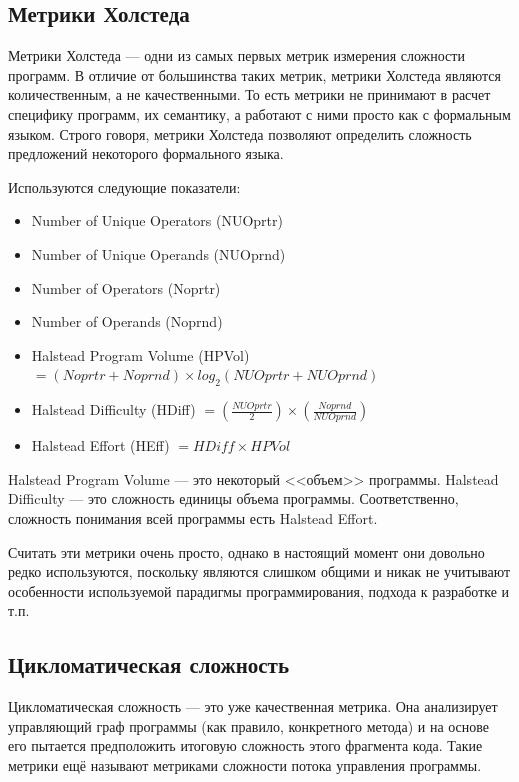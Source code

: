 \documentclass{../../text-style}
\begin{document}
\subsection{Метрики Холстеда}

Метрики Холстеда --- одни из самых первых метрик измерения сложности программ. В отличие от большинства таких метрик, метрики Холстеда являются количественным, а не качественными. То есть метрики не принимают в расчет специфику программ, их семантику, а работают с ними просто как с формальным языком. Строго говоря, метрики Холстеда позволяют определить сложность предложений некоторого формального языка. 

Используются следующие показатели:

\begin{itemize}
    \item Number of Unique Operators (NUOprtr)
    \item Number of Unique Operands (NUOprnd)
    \item Number of Operators (Noprtr)
    \item Number of Operands (Noprnd)
    \item Halstead Program Volume (HPVol) $= (Noprtr + Noprnd) \times log_2(NUOprtr + NUOprnd)$
    \item Halstead Difficulty (HDiff) $= (\frac{NUOprtr}{2}) \times (\frac{Noprnd}{NUOprnd})$
    \item Halstead Effort (HEff) $= HDiff \times HPVol$
\end{itemize}

Halstead Program Volume --- это некоторый <<объем>> программы. Halstead Difficulty --- это сложность единицы объема программы. Соответственно, сложность понимания всей программы есть Halstead Effort.

Считать эти метрики очень просто, однако в настоящий момент они довольно редко используются, поскольку являются слишком общими и никак не учитывают особенности используемой парадигмы программирования, подхода к разработке и т.п.

\subsection{Цикломатическая сложность}

Цикломатическая сложность --- это уже качественная метрика. Она анализирует управляющий граф программы (как правило, конкретного метода) и на основе его пытается предположить итоговую сложность этого фрагмента кода. Такие метрики ещё называют метриками сложности потока управления программы.
\end{document}
